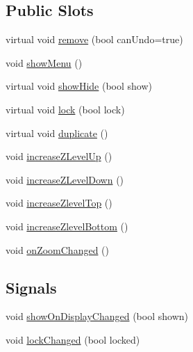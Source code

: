 \subsection*{Public Slots}
\begin{DoxyCompactItemize}
\item 
virtual void \hyperlink{class_u_b_graphics_item_delegate_a2ae1e0d0f30bebf2a25d444c509e28b9}{remove} (bool can\-Undo=true)
\item 
void \hyperlink{class_u_b_graphics_item_delegate_a2d0f4c4ab6660fc42dc76d89ca8a7240}{show\-Menu} ()
\item 
virtual void \hyperlink{class_u_b_graphics_item_delegate_a9d8abde4377bdfda898d6055585c0e8e}{show\-Hide} (bool show)
\item 
virtual void \hyperlink{class_u_b_graphics_item_delegate_ad3145f046572af4adcc760833c11c599}{lock} (bool lock)
\item 
virtual void \hyperlink{class_u_b_graphics_item_delegate_a525c69cb3c3c0df6c4db4d406fd80e48}{duplicate} ()
\item 
void \hyperlink{class_u_b_graphics_item_delegate_a31c9a6aef1b98b11b0b5bbd39fcba006}{increase\-Z\-Level\-Up} ()
\item 
void \hyperlink{class_u_b_graphics_item_delegate_a9551d8cb1d8eb9ecd93b8a8ae3a203d7}{increase\-Z\-Level\-Down} ()
\item 
void \hyperlink{class_u_b_graphics_item_delegate_a0e29a108ddbf7b7f8bd4d3319b144f65}{increase\-Zlevel\-Top} ()
\item 
void \hyperlink{class_u_b_graphics_item_delegate_a9aba13a2a47a1a4573cadbef4054ecd6}{increase\-Zlevel\-Bottom} ()
\item 
void \hyperlink{class_u_b_graphics_item_delegate_ad0cebb7e510d52d24c3a010239bcb5fe}{on\-Zoom\-Changed} ()
\end{DoxyCompactItemize}
\subsection*{Signals}
\begin{DoxyCompactItemize}
\item 
void \hyperlink{class_u_b_graphics_item_delegate_a2e13161a55c9568ef3ebcebbf549d4cb}{show\-On\-Display\-Changed} (bool shown)
\item 
void \hyperlink{class_u_b_graphics_item_delegate_a4afe1bba736659418f3d165ff935ad05}{lock\-Changed} (bool locked)
\end{DoxyCompactItemize}
